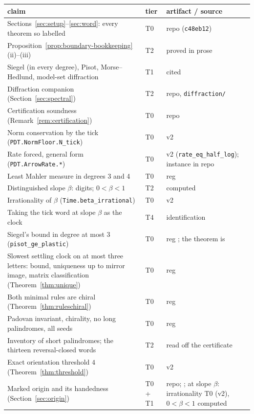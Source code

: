 \documentclass[11pt]{amsart}
\theoremstyle{plain}
\theoremstyle{definition}
\theoremstyle{remark}
\begin{document}
{\small
\begin{longtable}{p{}p{}p{}}
\hline
claim & tier & artifact / source \\
\hline
\endhead
Sections~\ref{sec:setup}--\ref{sec:word}: every theorem so labelled & T0 & repo (\texttt{c48eb12}) \\
Proposition~\ref{prop:boundary-bookkeeping}(ii)--(iii) & T2 & proved in prose \\
Siegel (in every degree), Pisot, Morse--Hedlund, model-set diffraction & T1 & cited \\
Diffraction companion (Section~\ref{sec:spectral}) & T2 & repo, \texttt{diffraction/} \\
Certification soundness (Remark~\ref{rem:certification}) & T0 & repo \\
Norm conservation by the tick (\texttt{PDT.NormFloor.N\_tick}) & T0 & v2 \\
Rate forced, general form (\texttt{PDT.ArrowRate.*}) & T0 & v2 (\texttt{rate\_eq\_half\_log}); instance in repo \\
Least Mahler measure in degrees 3 and 4 & T0 & reg \cite{palomar-mahler} \\
Distinguished slope $\beta$: digits; $0 < \beta < 1$ & T2 & computed \\
Irrationality of $\beta$ (\texttt{Time.beta\_irrational}) & T0 & v2 \\
Taking the tick word at slope $\beta$ as the clock & T4 & identification \\
Siegel's bound in degree at most $3$ (\texttt{pisot\_ge\_plastic}) & T0 & reg \cite{palomar-slowclock}; the theorem is \cite{siegel1944} \\
Slowest settling clock on at most three letters: bound, uniqueness up to mirror image, matrix classification (Theorem~\ref{thm:unique}) & T0 & reg \cite{palomar-slowclock} \\
Both minimal rules are chiral (Theorem~\ref{thm:ruleschiral}) & T0 & reg \cite{palomar-slowclock} \\
Padovan invariant, chirality, no long palindromes, all seeds & T0 & reg \cite{palomar-aot} \\
Inventory of short palindromes; the thirteen reversal-closed words & T2 & read off the certificate \\
Exact orientation threshold $4$ (Theorem~\ref{thm:threshold}) & T0 & v2 \\
Marked origin and its handedness (Section~\ref{sec:origin}) & T0 + T1 & repo; \cite{barbieri2021}; at slope $\beta$: irrationality T0 (v2), $0 < \beta < 1$ computed \\

\end{longtable}}
\end{document}
